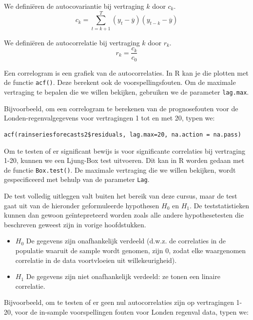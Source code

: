 \begin{definition}[Autocovariantie]
	We definiëren de autocovariantie bij vertraging $k$ door $c_k$.
	\[ c_k = \sum_{t=k+1}^{T} (y_t - \overline{y})(y_{t-k} - \overline{y}) \]
\end{definition}

\begin{definition}[Autocorrelatie]
	We definiëren de autocorrelatie bij vertraging $k$ door $r_k$.
	\[ r_k = \frac{c_k}{c_0} \]
\end{definition}

Een correlogram is een grafiek van de autocorrelaties. In R kan je die plotten met de functie \texttt{acf()}. Deze berekent ook de voorspellingsfouten. Om de maximale vertraging te bepalen die we willen bekijken, gebruiken we de parameter \texttt{lag.max}.

Bijvoorbeeld, om een correlogram te berekenen van de prognosefouten voor de Londen-regenvalgegevens voor vertragingen 1 tot en met 20, typen we:

\begin{lstlisting}
acf(rainseriesforecasts2$residuals, lag.max=20, na.action = na.pass)
\end{lstlisting}

Om te testen of er significant bewijs is voor significante correlaties bij vertraging 1-20, kunnen we een Ljung-Box test uitvoeren. Dit kan in R worden gedaan met de functie \texttt{Box.test()}. De maximale vertraging die we willen bekijken, wordt gespecificeerd met behulp van de parameter \texttt{Lag}.

De test volledig uitleggen valt buiten het bereik van deze cursus, maar de test gaat uit van de hieronder geformuleerde hypothesen $H_0$ en $H_1$. De teststatistieken kunnen dan gewoon geïntepreteerd worden zoals alle andere hypothesetesten die beschreven geweest zijn in vorige hoofdstukken. 

\begin{itemize}
  \item $H_0$ De gegevens zijn onafhankelijk verdeeld (d.w.z. de correlaties in de populatie waaruit de sample wordt genomen, zijn 0, zodat elke waargenomen correlatie in de data voortvloeien uit willekeurigheid).
  \item $H_1$ De gegevens zijn niet onafhankelijk verdeeld: ze tonen een linaire correlatie.
\end{itemize}

Bijvoorbeeld, om te testen of er geen nul autocorrelaties zijn op vertragingen 1-20, voor de in-sample voorspellingen fouten voor Londen regenval data, typen we:

